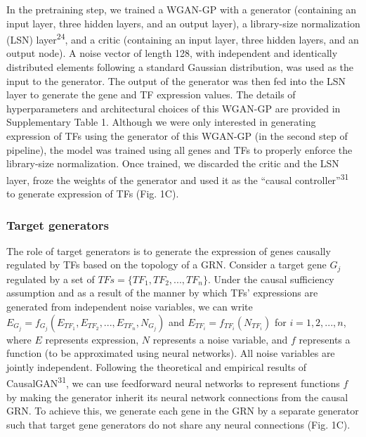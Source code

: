 In the pretraining step, we trained a WGAN-GP with a generator (containing an input layer, three hidden layers, and an output layer), a library-size normalization (LSN) layer\textsuperscript{24}, and a critic (containing an input layer, three hidden layers, and an output node). A noise vector of length 128, with independent and identically distributed elements following a standard Gaussian distribution, was used as the input to the generator. The output of the generator was then fed into the LSN layer to generate the gene and TF expression values. The details of hyperparameters and architectural choices of this WGAN-GP are provided in Supplementary Table 1. Although we were only interested in generating expression of TFs using the generator of this WGAN-GP (in the second step of pipeline), the model was trained using all genes and TFs to properly enforce the library-size normalization. Once trained, we discarded the critic and the LSN layer, froze the weights of the generator and used it as the “causal controller”\textsuperscript{31} to generate expression of TFs (Fig. 1C).


\subsubsection*{Target generators}

The role of target generators is to generate the expression of genes causally regulated by TFs based on the topology of a GRN. Consider a target gene $G_j$ regulated by a set of $TFs = \{TF_1, TF_2, ..., TF_n\}$. Under the causal sufficiency assumption and as a result of the manner by which TFs’ expressions are generated from independent noise variables, we can write $E_{G_j} = f_{G_j}(E_{TF_1}, E_{TF_2}, ..., E_{TF_n}, N_{G_j})$ and $E_{TF_i} = f_{TF_i}(N_{TF_i})$ for $i = 1, 2, ..., n$, where $E$ represents expression, $N$ represents a noise variable, and $f$ represents a function (to be approximated using neural networks). All noise variables are jointly independent. Following the theoretical and empirical results of CausalGAN\textsuperscript{31}, we can use feedforward neural networks to represent functions $f$ by making the generator inherit its neural network connections from the causal GRN. To achieve this, we generate each gene in the GRN by a separate generator such that target gene generators do not share any neural connections (Fig. 1C).

